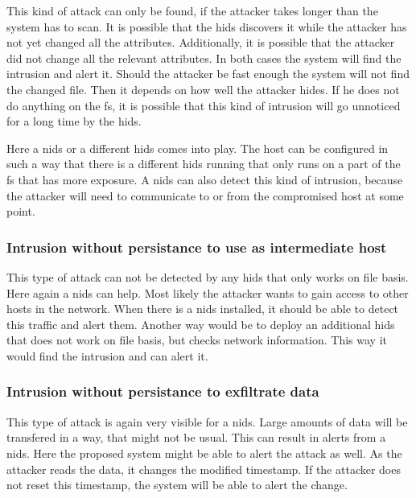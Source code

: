 \documentclass[
	a4paper,					%
	10pt,							%
	twoside,					%
	openright,				%
	notitlepage,			%
	parskip=half,			%
]{scrreprt}					%
\begin{document}
This kind of attack can only be found, if the attacker takes longer than the system has to scan. It is possible that the \gls{hids} discovers it while the attacker has not yet changed all the attributes. Additionally, it is possible that the attacker did not change all the relevant attributes. In both cases the system will find the intrusion and alert it. Should the attacker be fast enough the system will not find the changed file. Then it depends on how well the attacker hides. If he does not do anything on the \gls{fs}, it is possible that this kind of intrusion will go unnoticed for a long time by the \gls{hids}. 

Here a \gls{nids} or a different \gls{hids} comes into play. The host can be configured in such a way that there is a different \gls{hids} running that only runs on a part of the \gls{fs} that has more exposure. A \gls{nids} can also detect this kind of intrusion, because the attacker will need to communicate to or from the compromised host at some point. 

\subsubsection{Intrusion without persistance to use as intermediate host}
\label{sec:defense:nopersistanceintermediatehost}

This type of attack can not be detected by any \gls{hids} that only works on file basis. Here again a \gls{nids} can help. Most likely the attacker wants to gain access to other hosts in the network. When there is a \gls{nids} installed, it should be able to detect this traffic and alert them. Another way would be to deploy an additional \gls{hids} that does not work on file basis, but checks network information. This way it would find the intrusion and can alert it.

\subsubsection{Intrusion without persistance to exfiltrate data}
\label{sec:defense:nopersistanceexfiltration}

This type of attack is again very visible for a \gls{nids}. Large amounts of data will be transfered in a way, that might not be usual. This can result in alerts from a \gls{nids}. Here the proposed system might be able to alert the attack as well. As the attacker reads the data, it changes the modified timestamp. If the attacker does not reset this timestamp, the system will be able to alert the change. 
\end{document}
